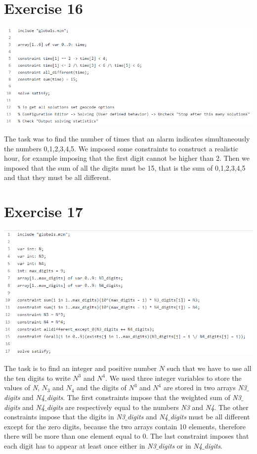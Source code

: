 \documentclass{article}
\begin{document}
\section{Exercise 16}
\vspace{0.2cm}
\includegraphics[width=15cm]{img/Es16.png}
\vspace{0.2cm}

The task was to find the number of times that an alarm indicates simultaneously the numbers 0,1,2,3,4,5. We imposed some constraints to construct a realistic hour, for example imposing that the first digit cannot be higher than 2. Then we imposed that the sum of all the digits must be 15, that is the sum of  0,1,2,3,4,5 and that they must be all different.

\section{Exercise 17}
\vspace{0.2cm}
\includegraphics[width=\linewidth]{img/Es17.png}
\vspace{0.2cm}

The task is to find an integer and positive number $N$ such that we have to use all the ten digits to write $N^3$ and $N^4$. 
We used three integer variables to store the values of \textit{N}, \textit{$N_3$} and \textit{$N_4$}
and the digits of $N^3$ and $N^4$ are stored in two arrays \textit{N3$\_$digits} and \textit{N4$\_$digits}. The first constraints impose that the weighted sum of \textit{N3$\_$digits} and \textit{N4$\_$digits} are respectively equal to the numbers \textit{N3} and \textit{N4}. The other constraints impose that the digits in \textit{N3$\_$digits} and \textit{N4$\_$digits} must be all different except for the zero digits, because the two arrays contain 10 elements, therefore there will be more than one element equal to 0. The last constraint imposes that each digit has to appear at least once either in \textit{N3$\_$digits} or in \textit{N4$\_$digits}.
\end{document}
